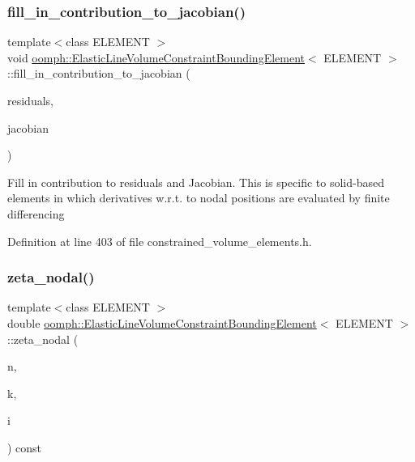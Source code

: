 \subsubsection{\texorpdfstring{fill\+\_\+in\+\_\+contribution\+\_\+to\+\_\+jacobian()}{fill\_in\_contribution\_to\_jacobian()}}
{\footnotesize\ttfamily template$<$class E\+L\+E\+M\+E\+NT $>$ \\
void \hyperlink{classoomph_1_1ElasticLineVolumeConstraintBoundingElement}{oomph\+::\+Elastic\+Line\+Volume\+Constraint\+Bounding\+Element}$<$ E\+L\+E\+M\+E\+NT $>$\+::fill\+\_\+in\+\_\+contribution\+\_\+to\+\_\+jacobian (\begin{DoxyParamCaption}\item[{Vector$<$ double $>$ \&}]{residuals,  }\item[{Dense\+Matrix$<$ double $>$ \&}]{jacobian }\end{DoxyParamCaption})\hspace{0.3cm}{\ttfamily [inline]}}

Fill in contribution to residuals and Jacobian. This is specific to solid-\/based elements in which derivatives w.\+r.\+t. to nodal positions are evaluated by finite differencing 

Definition at line 403 of file constrained\+\_\+volume\+\_\+elements.\+h.

\mbox{\label{classoomph_1_1ElasticLineVolumeConstraintBoundingElement_a99fee8b9d2bea757909174f26415139b}} 
\subsubsection{\texorpdfstring{zeta\+\_\+nodal()}{zeta\_nodal()}}
{\footnotesize\ttfamily template$<$class E\+L\+E\+M\+E\+NT $>$ \\
double \hyperlink{classoomph_1_1ElasticLineVolumeConstraintBoundingElement}{oomph\+::\+Elastic\+Line\+Volume\+Constraint\+Bounding\+Element}$<$ E\+L\+E\+M\+E\+NT $>$\+::zeta\+\_\+nodal (\begin{DoxyParamCaption}\item[{const unsigned \&}]{n,  }\item[{const unsigned \&}]{k,  }\item[{const unsigned \&}]{i }\end{DoxyParamCaption}) const\hspace{0.3cm}{\ttfamily [inline]}}



